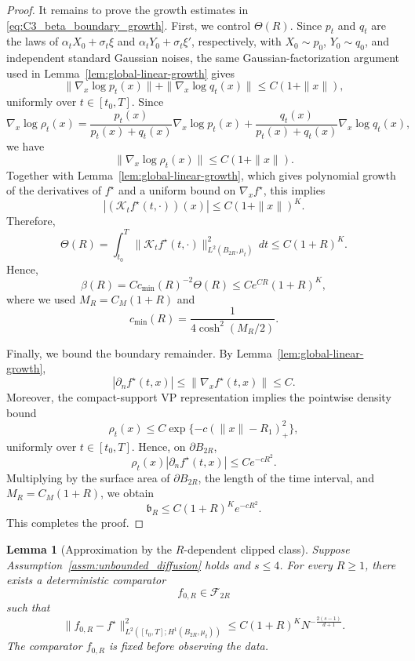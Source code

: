\documentclass[11pt]{article}
\theoremstyle{plain}
\newtheorem{lemma}[theorem]{Lemma}
\theoremstyle{definition}
\theoremstyle{remark}
\begin{document}
\begin{proof}
It remains to prove the growth estimates in
\eqref{eq:C3_beta_boundary_growth}. First, we control \(\Theta(R)\). Since
\(p_t\) and \(q_t\) are the laws of
\(\alpha_tX_0+\sigma_t\xi\) and \(\alpha_tY_0+\sigma_t\xi'\), respectively,
with \(X_0\sim p_0\), \(Y_0\sim q_0\), and independent standard Gaussian
noises, the same Gaussian-factorization argument used in
Lemma~\ref{lem:global-linear-growth} gives
\[
\|\nabla_x\log p_t(x)\|
+
\|\nabla_x\log q_t(x)\|
\le
C(1+\|x\|),
\]
uniformly over \(t\in[t_0,T]\). Since
\[
\nabla_x\log\rho_t(x)
=
\frac{p_t(x)}{p_t(x)+q_t(x)}\nabla_x\log p_t(x)
+
\frac{q_t(x)}{p_t(x)+q_t(x)}\nabla_x\log q_t(x),
\]
we have
\[
\|\nabla_x\log\rho_t(x)\|
\le
C(1+\|x\|).
\]
Together with Lemma~\ref{lem:global-linear-growth}, which gives polynomial
growth of the derivatives of \(f^\star\) and a uniform bound on
\(\nabla_x f^\star\), this implies
\[
|(\mathcal K_t f^\star(t,\cdot))(x)|
\le
C(1+\|x\|)^K.
\]
Therefore,
\[
\Theta(R)
=
\int_{t_0}^T
\|\mathcal K_t f^\star(t,\cdot)\|_{L^2(B_{2R},\mu_t)}^2\,dt
\le
C(1+R)^K.
\]
Hence,
\[
\beta(R)
=
C c_{\min}(R)^{-2}\Theta(R)
\le
C e^{CR}(1+R)^K,
\]
where we used \(M_R=C_M(1+R)\) and
\[
c_{\min}(R)
=
\frac{1}{4\cosh^2(M_R/2)}.
\]

Finally, we bound the boundary remainder. By
Lemma~\ref{lem:global-linear-growth},
\[
|\partial_n f^\star(t,x)|
\le
\|\nabla_x f^\star(t,x)\|
\le C.
\]
Moreover, the compact-support VP representation implies the pointwise density
bound
\[
\rho_t(x)\le C\exp\{-c(\|x\|-R_1)_+^2\},
\]
uniformly over \(t\in[t_0,T]\). Hence, on \(\partial B_{2R}\),
\[
\rho_t(x)|\partial_n f^\star(t,x)|
\le
C e^{-cR^2}.
\]
Multiplying by the surface area of \(\partial B_{2R}\), the length of the
time interval, and \(M_R=C_M(1+R)\), we obtain
\[
\mathfrak b_R
\le
C(1+R)^K e^{-cR^2}.
\]
This completes the proof.
\end{proof}

\begin{lemma}[Approximation by the \(R\)-dependent clipped class]
\label{lem:C4-rescaled-approx}
Suppose Assumption~\ref{assm:unbounded_diffusion} holds and
\(s\le4\).
For every \(R\ge1\), there exists a deterministic comparator
\[
f_{0,R}\in\mathcal F_{2R}
\]
such that
\begin{equation}
\label{eq:C4_target_approx_poly}
\|f_{0,R}-f^\star\|_{L^2([t_0,T];H^1(B_{2R},\mu_t))}^2
\le
C(1+R)^K
N^{-\frac{2(s-1)}{d+1}}.
\end{equation}
The comparator \(f_{0,R}\) is fixed before observing the data.
\end{lemma}
\end{document}

